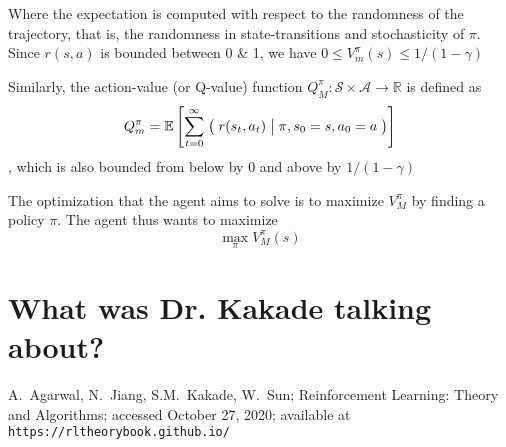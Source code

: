 \documentclass[12pt,reqno]{amsart}
\newcommand{\Cond}[2]{\bigm( {#1} \bigm\vert {#2}\bigm)}
\newcommand{\E}{\mathbb E}
\begin{document}
Where the expectation is computed with respect to the randomness of the trajectory, that is, the randomness in state-transitions and stochasticity of $\pi$. Since $r(s,a)$ is bounded between 0 \& 1, we have $0 \leq V_{m}^{\pi}(s) \leq 1/(1 - \gamma)$

Similarly, the action-value (or Q-value) function $Q_{M}^{\pi} : \mathcal{S} \times \mathcal{A} \rightarrow \mathbb{R}$ is defined as 
\begin{equation}\label{eqn:Q}
Q_{m}^{\pi} = \E \left[\sum\limits_{t = 0}^{\infty} \Cond{r(s_{t},a_{t})}{\pi, s_{0} = s, a_{0} = a}    \right]
\end{equation}
, which is also bounded from below by 0 and above by $1/(1-\gamma)$

\medskip

The optimization that the agent aims to solve is to maximize $V_{M}^{\pi}$ by finding a policy $\pi$. The agent thus wants to maximize
\begin{equation}\label{eqn:optvalues}
\max\limits_{\pi} V_{M}^{\pi}(s)
\end{equation}

\section{What was Dr. Kakade talking about?}



\begin{thebibliography}{99}

 A.\ Agarwal, N.\ Jiang, S.M.\ Kakade, W.\ Sun; Reinforcement Learning: Theory and Algorithms; accessed October 27, 2020; available at \texttt{https://rltheorybook.github.io/}
\end{thebibliography}
\end{document}
